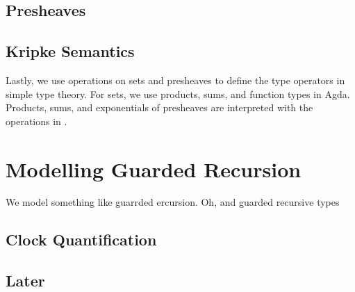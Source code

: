 \documentclass[a4paper,UKenglish,cleveref, autoref,numberwithinsect]{lipics-v2019}
\begin{document}
\subsection{Presheaves}
\label{sec:presheaves}














\subsection{Kripke Semantics}












Lastly, we use operations on sets and presheaves to define the type operators in simple type theory.
For sets, we use products, sums, and function types in Agda.
Products, sums, and exponentials of presheaves are interpreted with the operations in .

\section{Modelling Guarded Recursion}
We model something like guarrded ercursion.
Oh, and guarded recursive types

\subsection{Clock Quantification}



\subsection{Later}



\end{document}
